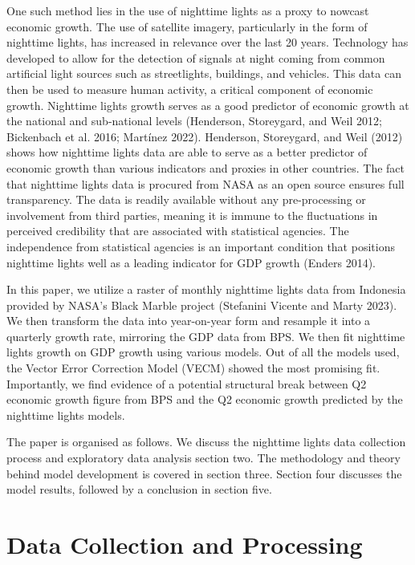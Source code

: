 \documentclass[
]{interact}
\begin{document}
One such method lies in the use of nighttime lights as a proxy to
nowcast economic growth. The use of satellite imagery, particularly in
the form of nighttime lights, has increased in relevance over the last
20 years. Technology has developed to allow for the detection of signals
at night coming from common artificial light sources such as
streetlights, buildings, and vehicles. This data can then be used to
measure human activity, a critical component of economic growth.
Nighttime lights growth serves as a good predictor of economic growth at
the national and sub-national levels (Henderson, Storeygard, and Weil
2012; Bickenbach et al. 2016; Martínez 2022). Henderson, Storeygard, and
Weil (2012) shows how nighttime lights data are able to serve as a
better predictor of economic growth than various indicators and proxies
in other countries. The fact that nighttime lights data is procured from
NASA as an open source ensures full transparency. The data is readily
available without any pre-processing or involvement from third parties,
meaning it is immune to the fluctuations in perceived credibility that
are associated with statistical agencies. The independence from
statistical agencies is an important condition that positions nighttime
lights well as a leading indicator for GDP growth (Enders 2014).

In this paper, we utilize a raster of monthly nighttime lights data from
Indonesia provided by NASA's Black Marble project (Stefanini Vicente and
Marty 2023). We then transform the data into year-on-year form and
resample it into a quarterly growth rate, mirroring the GDP data from
BPS. We then fit nighttime lights growth on GDP growth using various
models. Out of all the models used, the Vector Error Correction Model
(VECM) showed the most promising fit. Importantly, we find evidence of a
potential structural break between Q2 economic growth figure from BPS
and the Q2 economic growth predicted by the nighttime lights models.

The paper is organised as follows. We discuss the nighttime lights data
collection process and exploratory data analysis section two. The
methodology and theory behind model development is covered in section
three. Section four discusses the model results, followed by a
conclusion in section five.

\section{Data Collection and
Processing}\label{data-collection-and-processing}
\end{document}
